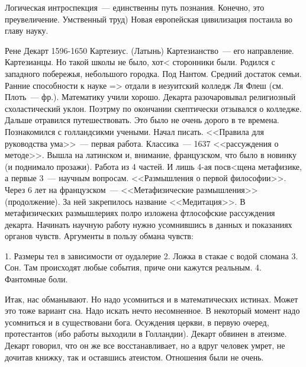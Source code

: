 Логическая интроспекция~--- единственны путь познания. Конечно, это преувеличение. Умственный труд) Новая европейская цивилизация постаила во главу науку.



Рене Декарт 1596-1650 
Картезиус. (Латынь)
Картезианство~--- его направление. Картезианцы. Но такой школы не было, хот< сторонники были.
Родился с западного побережья, небольшого городка. Под Нантом. Средний достаток семьи. Ранние способности к науке => отдали в иезуитский колледж Ля Флеш (см. Плоть~--- фр.). Математику учили хорошо. Декарта разочаровывал религиозный схоластический уклон. Поэтрму по окончании скептически отзывался о колледже. Дальше отравился путешествовать. Это было не очень дорого в те времена. Познакомился с голландсикми учеными. Начал писать. <<Правила для руководства ума>>~--- первая работа. Классика~--- 1637 <<рассуждения о методе>>. Вышла на латинском и, внимание, французском, что было в новинку (и поднимало прозажи). Работа из 4 частей. И лишь 4-ая посв<щена метафизике, а первые 3~--- научным вопросам. <<Размышления о первой философии>>. Через 6 лет на французском~--- <<Метафизические размышления>> (продолжение). За ней закрепилось название <<Медитация>>. В метафизических размышлериях полро изложена фтлософские рассуждения декарта. Начинать научную работу нужно усомнившись в данных и показаниях органов чувств. Аргументы в пользу обмана чувств:

	1. Размеры тел в зависимости от оудалерие
	2. Ложка в стакае с водой сломана
	3. Сон. Там происходят любые события, приче они кажутся реальным.
	4. Фантомные боли.

Итак, нас обманывают. Но надо усомниться и в математических истинах. Может это тоже вариант сна. Надо искать нечто несомненное. В некоторый момент надо усомниться и в существовани  бога. Осуждения церкви, в первую очеред, протестантов (ибо работы выходили в Голландии). Декарт обвинен в атеизме. Декарт говорил, что он же все восстанавливает, но а вдруг человек умрет, не дочитав книжку, так и оставшись атеистом. Отношения были не очень.

